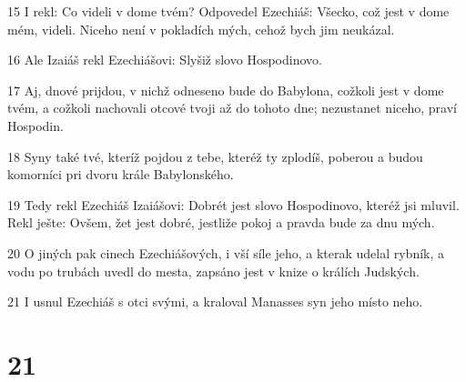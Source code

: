 \par 15 I rekl: Co videli v dome tvém? Odpovedel Ezechiáš: Všecko, což jest v dome mém, videli. Niceho není v pokladích mých, cehož bych jim neukázal.
\par 16 Ale Izaiáš rekl Ezechiášovi: Slyšiž slovo Hospodinovo.
\par 17 Aj, dnové prijdou, v nichž odneseno bude do Babylona, cožkoli jest v dome tvém, a cožkoli nachovali otcové tvoji až do tohoto dne; nezustanet niceho, praví Hospodin.
\par 18 Syny také tvé, kteríž pojdou z tebe, kteréž ty zplodíš, poberou a budou komorníci pri dvoru krále Babylonského.
\par 19 Tedy rekl Ezechiáš Izaiášovi: Dobrét jest slovo Hospodinovo, kteréž jsi mluvil. Rekl ješte: Ovšem, žet jest dobré, jestliže pokoj a pravda bude za dnu mých.
\par 20 O jiných pak cinech Ezechiášových, i vší síle jeho, a kterak udelal rybník, a vodu po trubách uvedl do mesta, zapsáno jest v knize o králích Judských.
\par 21 I usnul Ezechiáš s otci svými, a kraloval Manasses syn jeho místo neho.

\chapter{21}

